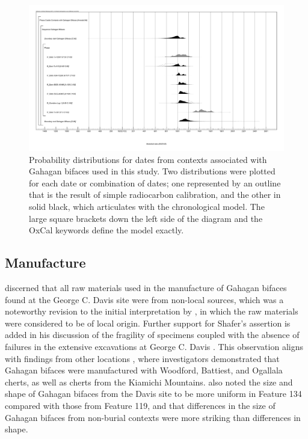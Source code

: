 \documentclass[review]{elsarticle}
\begin{document}
\begin{figure}[ht]\centering
\includegraphics[width=\linewidth]{fig03}
\caption{Probability distributions for dates from contexts associated with Gahagan bifaces used in this study. Two distributions were plotted for each date or combination of dates; one represented by an outline that is the result of simple radiocarbon calibration, and the other in solid black, which articulates with the chronological model. The large square brackets down the left side of the diagram and the OxCal keywords define the model exactly.}
\label{fig:fig3}
\end{figure}

\subsection*{Manufacture}

\citet{RN3684} discerned that all raw materials used in the manufacture of Gahagan bifaces found at the George C. Davis site were from non-local sources, which was a noteworthy revision to the initial interpretation by \citet{RN800}, in which the raw materials were considered to be of local origin. Further support for Shafer’s assertion is added in his discussion of the fragility of specimens coupled with the absence of failures in the extensive excavations at George C. Davis \citep{RN3684}. This observation aligns with findings from other locations \citep{RN1001}, where investigators demonstrated that Gahagan bifaces were manufactured with Woodford, Battiest, and Ogallala cherts, as well as cherts from the Kiamichi Mountains. \citet{RN3684} also noted the size and shape of Gahagan bifaces from the Davis site to be more uniform in Feature 134 compared with those from Feature 119, and that differences in the size of Gahagan bifaces from non-burial contexts were more striking than differences in shape.
\end{document}
